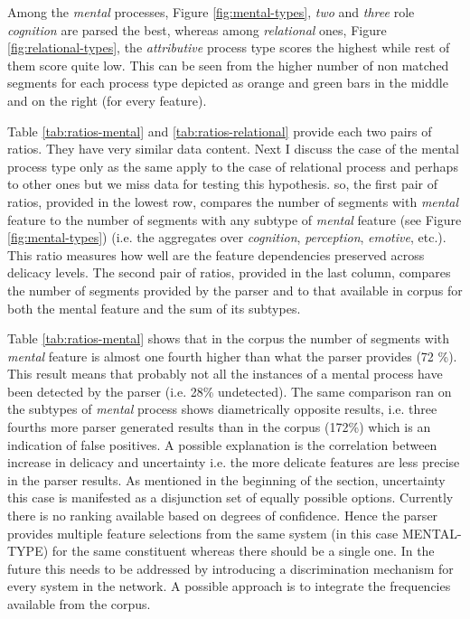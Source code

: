 Among the \textit{mental} processes, Figure \ref{fig:mental-types}, \textit{two} and \textit{three} role \textit{cognition} are parsed the best, whereas among \textit{relational} ones, Figure \ref{fig:relational-types}, the \textit{attributive} process type scores the highest while rest of them score quite low. This can be seen from the higher number of non matched segments for each process type depicted as orange and green bars in the middle and on the right (for every feature). 


Table \ref{tab:ratios-mental} and \ref{tab:ratios-relational} provide each two pairs of ratios. They have very similar data content. Next I discuss the case of the mental process type only as the same apply to the case of relational process and perhaps to other ones but we miss data for testing this hypothesis. so, the first pair of ratios, provided in the lowest row, compares the number of segments with \textit{mental} feature to the number of segments with any subtype of \textit{mental} feature (see Figure \ref{fig:mental-types}) (i.e. the aggregates over \textit{cognition}, \textit{perception}, \textit{emotive}, etc.). This ratio measures how well are the feature dependencies preserved across delicacy levels. The second pair of ratios, provided in the last column, compares the number of segments provided by the parser and to that available in corpus for both the mental feature and the sum of its subtypes. 

Table \ref{tab:ratios-mental} shows that in the corpus the number of segments with \textit{mental} feature is almost one fourth higher than what the parser provides (72 \%). This result means that probably not all the instances of a mental process have been detected by the parser (i.e. 28\% undetected). The same comparison ran on the subtypes of \textit{mental} process shows diametrically opposite results, i.e. three fourths more parser generated results than in the corpus (172\%) which is an indication of false positives. A possible explanation is the correlation between increase in delicacy and uncertainty i.e. the more delicate features are less precise in the parser results. As mentioned in the beginning of the section, uncertainty this case is manifested as a disjunction set of equally possible options. Currently there is no ranking available based on degrees of confidence. Hence the parser provides multiple feature selections from the same system (in this case MENTAL-TYPE) for the same constituent whereas there should be a single one. In the future this needs to be addressed by introducing a discrimination mechanism for every system in the network. A possible approach is to integrate the frequencies available from the corpus.

